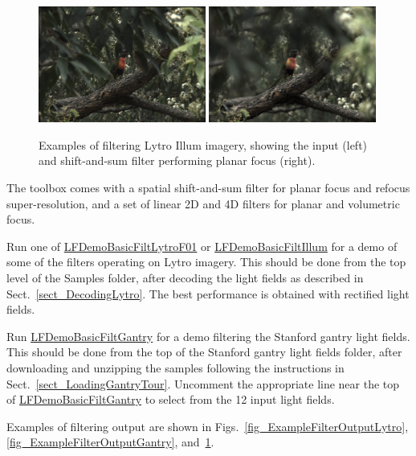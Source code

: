 \documentclass[onecolumn]{article}
\newcommand{\CiteFunc}[1]{\hyperlink{#1}{\small #1}}
\begin{document}
\begin{figure}
	\centering
	\includegraphics[width=0.49\textwidth]{Figs/LorikeetHiding_in}
	\includegraphics[width=0.49\textwidth]{Figs/LorikeetHiding_shiftsum_bird}
	\caption{Examples of filtering Lytro Illum imagery, showing the input (left) and shift-and-sum filter performing planar focus (right).}
	\label{fig_ExampleFilterOutputIllum}
\end{figure}

The toolbox comes with a spatial shift-and-sum filter for planar focus and refocus super-resolution, and a set of linear 2D and 4D filters for planar and volumetric focus.

Run one of \CiteFunc{LFDemoBasicFiltLytroF01} or \CiteFunc{LFDemoBasicFiltIllum} for a demo of some of the filters operating on Lytro imagery. This should be done from the top level of the Samples folder, after decoding the light fields as described in Sect.~\ref{sect_DecodingLytro}.  The best performance is obtained with rectified light fields.

Run \CiteFunc{LFDemoBasicFiltGantry} for a demo filtering the Stanford gantry light fields.  This should be done from the top of the Stanford gantry light fields folder, after downloading and unzipping the samples following the instructions in Sect.~\ref{sect_LoadingGantryTour}. Uncomment the appropriate line near the top of \CiteFunc{LFDemoBasicFiltGantry} to select from the 12 input light fields.

Examples of filtering output are shown in Figs.~\ref{fig_ExampleFilterOutputLytro}, \ref{fig_ExampleFilterOutputGantry}, and~\ref{fig_ExampleFilterOutputIllum}.
\end{document}

